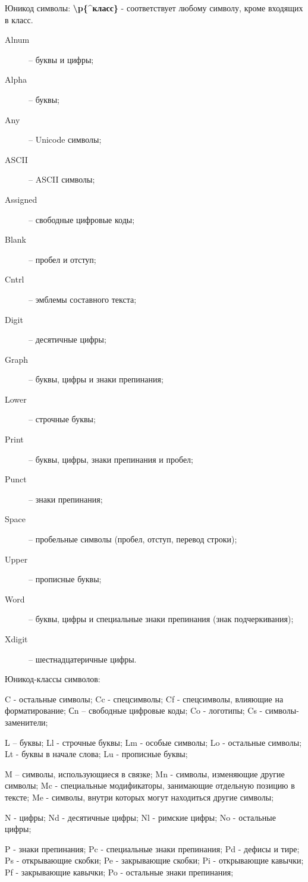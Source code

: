 \begin{keylist}{Юникод символы:}
{\bf \textbackslash p\{\textasciicircum класс\}} - соответствует любому символу, кроме входящих в класс.
  \begin{description}
    \item[Alnum]    – буквы и цифры; 
    \item[Alpha]    – буквы;
    \item[Any]      – Unicode символы;
    \item[ASCII]    – ASCII символы;
    \item[Assigned] – свободные цифровые коды;
    \item[Blank]    – пробел и отступ;
    \item[Cntrl]    – эмблемы составного текста;
    \item[Digit]    – десятичные цифры;
    \item[Graph]    – буквы, цифры и знаки препинания;
    \item[Lower]    – строчные буквы;
    \item[Print]    – буквы, цифры, знаки препинания и пробел;
    \item[Punct]    – знаки препинания;
    \item[Space]    – пробельные символы (пробел, отступ, перевод строки);
    \item[Upper]    – прописные буквы;
    \item[Word]     – буквы, цифры и специальные знаки препинания (знак подчеркивания);
    \item[Xdigit]   – шестнадцатеричные цифры.
  \end{description}
\end{keylist}

Юникод-классы символов:

C - остальные символы; Cc - спецсимволы; Cf - спецсимволы, влияющие на форматирование; Сn – свободные цифровые коды; Co - логотипы; Cs - символы-заменители;

L – буквы; Ll - строчные буквы; Lm - особые символы; Lo - остальные символы; Lt - буквы в начале слова; Lu - прописные буквы;

M – символы, использующиеся в связке; Mn - символы, изменяющие другие символы; Mc - специальные модификаторы, занимающие отдельную позицию в тексте; Me - символы, внутри которых могут находиться другие символы;

N - цифры; Nd - десятичные цифры; Nl - римские цифры; No - остальные цифры;

P - знаки препинания; Pc - специальные знаки препинания; Pd - дефисы и тире; Ps - открывающие скобки; Pe - закрывающие скобки; Pi - открывающие кавычки; Pf - закрывающие кавычки; Po - остальные знаки препинания;

